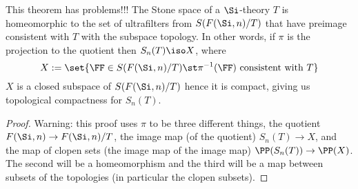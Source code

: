 \begin{prop}
    This theorem has problems!!!%
    The Stone space of a $\Si$-theory $T$ is homeomorphic 
    to the set of ultrafilters from $S(F(\Si,n) / T)$ 
    that have preimage consistent with $T$ with the subspace topology.
    In other words, if $\pi$ is the projection to the quotient then
    $S_n(T) \iso X$, where
    \[X := 
    \set{\FF \in S(F(\Si,n) / T) \st \pi^{-1}(\FF) \text{ consistent with } T}\]
    $X$ is a closed subspace of $S(F(\Si,n) / T)$ hence it is compact,
    giving us topological compactness for $S_n(T)$.
\end{prop}
\begin{proof}
    Warning: this proof uses $\pi$ to be three different things,
    the quotient $F(\Si,n) \to F(\Si,n) / T$, 
    the image map (of the quotient) $S_n(T) \to X$, 
    and the map of clopen sets (the image map of the image map) 
    $\PP(S_n(T)) \to \PP(X)$.
    The second will be a homeomorphism and the third will be a map between
    subsets of the topologies (in particular the clopen subsets).


\end{proof}
